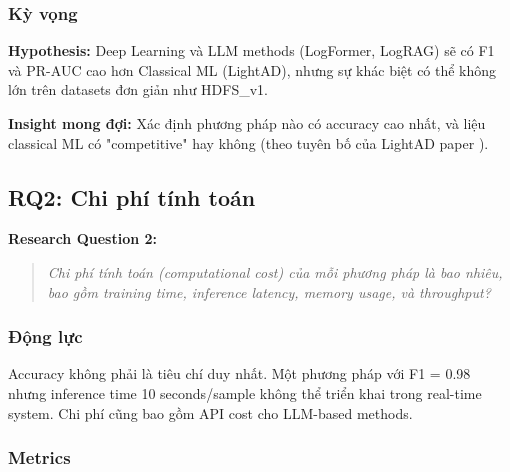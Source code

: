 \subsubsection{Kỳ vọng}

\textbf{Hypothesis:} Deep Learning và LLM methods (LogFormer, LogRAG) sẽ có F1 và PR-AUC cao hơn Classical ML (LightAD), nhưng sự khác biệt có thể không lớn trên datasets đơn giản như HDFS\_v1.

\textbf{Insight mong đợi:} Xác định phương pháp nào có accuracy cao nhất, và liệu classical ML có "competitive" hay không (theo tuyên bố của LightAD paper \cite{yu2024lightad}).

\subsection{RQ2: Chi phí tính toán}
\label{subsec:rq2}

\textbf{Research Question 2:}

\begin{quote}
\textit{Chi phí tính toán (computational cost) của mỗi phương pháp là bao nhiêu, bao gồm training time, inference latency, memory usage, và throughput?}
\end{quote}

\subsubsection{Động lực}

Accuracy không phải là tiêu chí duy nhất. Một phương pháp với F1 = 0.98 nhưng inference time 10 seconds/sample không thể triển khai trong real-time system. Chi phí cũng bao gồm API cost cho LLM-based methods.

\subsubsection{Metrics}

